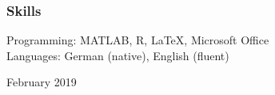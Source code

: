 \documentclass[10pt,a4paper]{article}
\begin{document}
\vspace{0.2cm}
\subsubsection*{Skills}
Programming: MATLAB, R, \LaTeX, Microsoft Office \\
Languages: German (native), English (fluent)

\begin{flushright}
	February 2019
\end{flushright}

	
\end{document}
